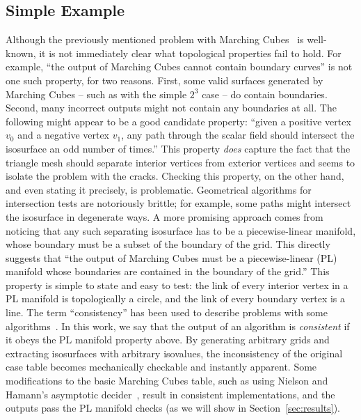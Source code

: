 \subsection{Simple Example} Although the previously mentioned problem
with Marching Cubes~\cite{lor87} is well-known, it is not
immediately clear what topological properties
fail to hold. For example, ``the output of Marching Cubes cannot
contain boundary curves'' is not one such property, for two
reasons. First, some valid surfaces generated by Marching Cubes --
such as with the simple $2^3$ case -- do contain boundaries. Second,
many incorrect outputs might not contain any boundaries at all. The
following might appear to be a good candidate property: ``given a
positive vertex $v_0$ and a negative vertex $v_1$, any path through
the scalar field should intersect the isosurface an odd number of
times.'' This property \emph{does} capture the fact that the triangle
mesh should separate interior vertices from exterior vertices and
seems to isolate the problem with the cracks. Checking this property,
on the other hand, and even stating it precisely, is
problematic. Geometrical algorithms for intersection tests are
notoriously brittle; for example, some paths might intersect the
isosurface in degenerate ways.  A more promising approach comes from
noticing that any such separating isosurface has to be a piecewise-linear
manifold, whose boundary must be a subset of the boundary of the
grid. This directly suggests that ``the output of Marching Cubes must
be a piecewise-linear (PL) manifold whose boundaries are contained in
the boundary of the grid.''  This property is simple to state and easy
to test: the link of every interior vertex in a PL manifold is
topologically a circle, and the link of every boundary vertex is a
line.
%
The term ``consistency'' has been used to describe problems with some
algorithms~\cite{newman:candg:2006}. In this work, we say that the
output of an algorithm is \emph{consistent} if it obeys the PL
manifold property above.  By generating arbitrary grids and extracting
isosurfaces with arbitrary isovalues, the inconsistency of the
original case table becomes mechanically checkable and instantly
apparent.
%
Some modifications to the basic Marching Cubes table, such as using
Nielson and Hamann's asymptotic decider~\cite{Nielson:1991:ADR:949607.949621}, result in
consistent implementations, and the outputs pass the PL manifold
checks (as we will show in Section~\ref{sec:results}).

